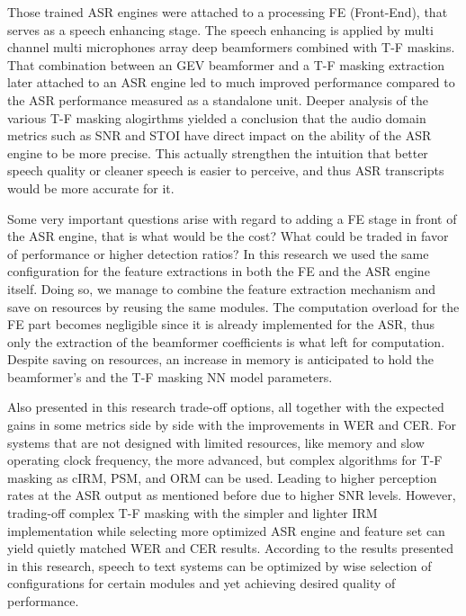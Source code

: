 \bigskip

Those trained ASR engines were attached to
a processing FE (Front-End), that serves as
a speech enhancing stage. The speech enhancing
is applied by multi channel multi microphones array
deep beamformers combined with T-F maskins.
That combination between an GEV beamformer 
and a T-F masking extraction later attached to
an ASR engine led to much improved
performance compared to the ASR performance
measured as a standalone unit.
Deeper analysis of the various T-F masking alogirthms
yielded a conclusion that the audio domain metrics
such as SNR and STOI have direct impact on 
the ability of the ASR engine to be more precise.
This actually strengthen the intuition that 
better speech quality or cleaner speech
is easier to perceive, and thus 
ASR transcripts would be more accurate for it.

\bigskip

Some very important questions arise with regard to 
adding a FE stage in front of the ASR engine,
that is what would be the cost? What could be traded
in favor of performance or higher detection ratios?
In this research we used the same configuration
for the feature extractions in both the
FE and the ASR engine itself. 
Doing so, we manage to combine the feature extraction
mechanism and save on resources by reusing
the same modules. The computation overload
for the FE part becomes negligible since it is 
already implemented for the ASR, thus
only the extraction of the beamformer coefficients is
what left for computation. Despite saving on resources,
an increase in memory is anticipated to hold
the beamformer's and the T-F masking NN model parameters.

\bigskip

Also presented in this research trade-off options,
all together with the expected gains in some metrics
side by side with the improvements in WER and CER.
For systems that are not designed with limited resources,
like memory and slow operating clock frequency, 
the more advanced, but complex algorithms for T-F masking
as cIRM, PSM, and ORM can be used.
Leading to higher perception rates at the ASR output
as mentioned before due to higher SNR levels. However,
trading-off complex T-F masking with the simpler and
lighter IRM implementation while selecting more optimized
ASR engine and feature set can yield quietly matched
WER and CER results. According to the results presented
in this research, speech to text systems can be optimized
by wise selection 
of configurations for certain
modules and yet achieving desired quality of performance.
